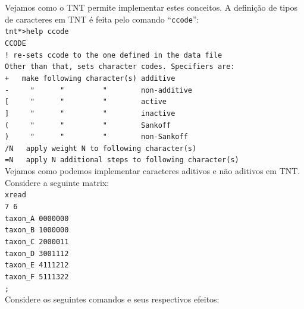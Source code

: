 \begin{refsection}
	Vejamos como o TNT permite implementar estes conceitos. A definição de tipos de caracteres em TNT é feita pelo comando ``\texttt{ccode}'':
\\
\texttt{tnt*>help ccode}\\
\texttt{CCODE}\\
\texttt{\indent !  re-sets ccode to the one defined in the data file }\\
\texttt{\indent Other than that, sets character codes.  Specifiers are: }\\
\texttt{\indent\indent +~~~make following character(s) additive }\\
\texttt{\indent\indent -~~~~~"~~~~~~"~~~~~~~~~"~~~~~~~~non-additive }\\
\texttt{\indent\indent [~~~~~"~~~~~~"~~~~~~~~~"~~~~~~~~active }\\
\texttt{\indent\indent ]~~~~~"~~~~~~"~~~~~~~~~"~~~~~~~~inactive }\\
\texttt{\indent\indent (~~~~~"~~~~~~"~~~~~~~~~"~~~~~~~~Sankoff }\\
\texttt{\indent\indent )~~~~~"~~~~~~"~~~~~~~~~"~~~~~~~~non-Sankoff }\\
\texttt{\indent\indent /N~~~apply weight N to following character(s) }\\
\texttt{\indent\indent =N~~~apply N additional steps to following character(s) }\\

Vejamos como podemos implementar caracteres aditivos e não aditivos em TNT. Considere a seguinte matrix:
\\
\texttt{xread}\\
\texttt{7 6}\\
\texttt{taxon\_A 0000000}\\
\texttt{taxon\_B 1000000}\\
\texttt{taxon\_C 2000011}\\
\texttt{taxon\_D 3001112}\\
\texttt{taxon\_E 4111212}\\
\texttt{taxon\_F 5111322}\\
\texttt{;}\\

Considere os seguintes comandos e seus respectivos efeitos:


\end{refsection}
